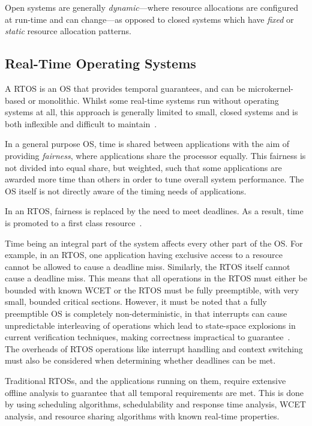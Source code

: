 Open systems are generally \emph{dynamic}---where resource allocations are configured at run-time
and can change---as opposed to closed systems which have \emph{fixed} or \emph{static} resource
allocation patterns.

\subsection{Real-Time Operating Systems}

A \gls{RTOS} is an \gls{OS} that provides temporal guarantees, and can be microkernel-based or
monolithic.  Whilst some real-time systems run without operating systems at all, this approach is
generally limited to small, closed systems and is both inflexible and difficult to
maintain~\citep{Lui_AACBBBCLM_04}.

In a general purpose \gls{OS}, time is shared between applications with the aim of providing
\emph{fairness}, where applications share the processor equally.  This fairness is not divided into
equal share, but weighted, such that some applications are awarded more time than others in order
to tune overall system performance.  The \gls{OS} itself is not directly aware of the timing needs of
applications.

In an \gls{RTOS}, fairness is replaced by the need to meet deadlines. As a result, time is promoted
to a first class resource~\citep{Stankovic_88}.

Time being an integral part of the system affects every other part of the \gls{OS}.  For example, in
an \gls{RTOS}, one application having exclusive access to a resource cannot be allowed to cause a
deadline miss.  Similarly, the \gls{RTOS} itself cannot cause a deadline miss.  This means that all
operations in the \gls{RTOS} must either be bounded with known {\gls{WCET}} or the \gls{RTOS} must
be fully preemptible, with very small, bounded critical sections.  However, it must be noted that a fully preemptible \gls{OS} is completely
non-deterministic, in that interrupts can cause unpredictable interleaving of operations which lead
to state-space explosions in current verification techniques, making correctness impractical to guarantee~\citep{Blackham_TH_12}.  The overheads
of \gls{RTOS} operations like interrupt handling and context switching must also be considered when
determining whether deadlines can be met.

Traditional \glspl{RTOS}, and the applications running on them, require extensive offline analysis
to guarantee that all temporal requirements are met.  This is done by using scheduling algorithms,
schedulability and response time analysis,
\gls{WCET} analysis, and resource sharing algorithms with known real-time properties.

